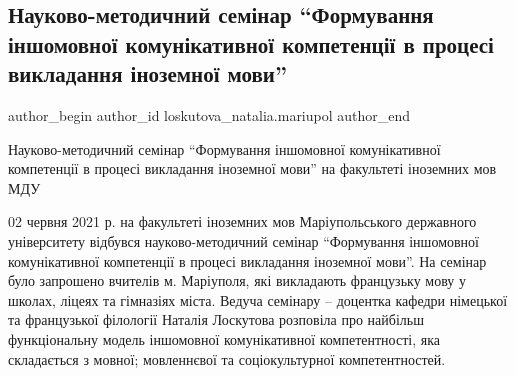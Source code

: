  
 
 
 
 

\subsection{Науково-методичний семінар \enquote{Формування іншомовної комунікативної компетенції в процесі викладання іноземної мови}}
\label{sec:02_06_2021.fb.loskutova_natalia.mariupol.1.seminar_formuvannja_kompetencii}

\ifcmt
 author_begin
   author_id loskutova_natalia.mariupol
 author_end
\fi

Науково-методичний семінар \enquote{Формування іншомовної комунікативної компетенції в
процесі викладання іноземної мови} на факультеті іноземних мов МДУ


02 червня 2021 р. на факультеті іноземних мов Маріупольського державного
університету відбувся науково-методичний семінар \enquote{Формування іншомовної
комунікативної компетенції в процесі викладання іноземної мови}. На семінар
було запрошено вчителів м. Маріуполя, які викладають французьку мову у школах,
ліцеях та гімназіях міста. Ведуча семінару – доцентка кафедри німецької та
французької філології Наталія Лоскутова розповіла про найбільш функціональну
модель іншомовної комунікативної компетентності, яка складається з мовної;
мовленнєвої та соціокультурної компетентностей.

